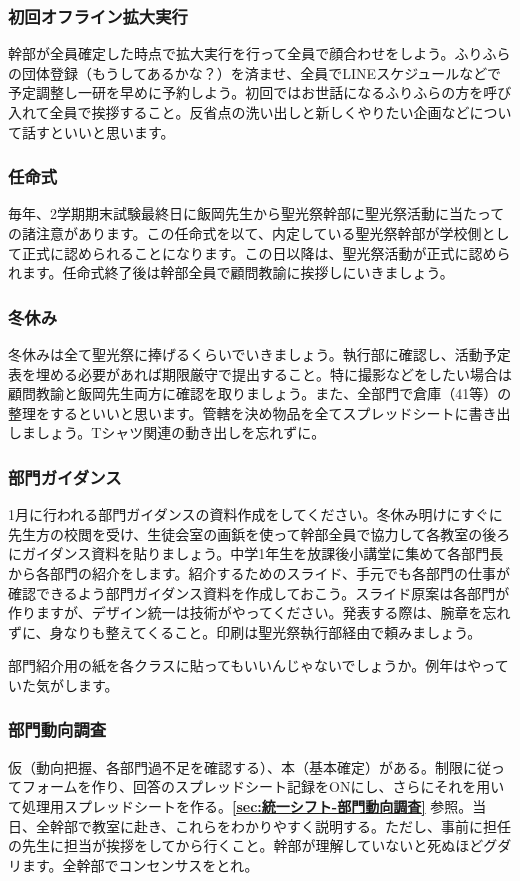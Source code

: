 \documentclass[dvipdfmx,jb5]{jarticle}
\begin{document}
\subsubsection{初回オフライン拡大実行}
幹部が全員確定した時点で拡大実行を行って全員で顔合わせをしよう。ふりふらの団体登録（もうしてあるかな？）を済ませ、全員でLINEスケジュールなどで予定調整し一研を早めに予約しよう。初回ではお世話になるふりふらの方を呼び入れて全員で挨拶すること。反省点の洗い出しと新しくやりたい企画などについて話すといいと思います。

\subsubsection{任命式}
毎年、2学期期末試験最終日に飯岡先生から聖光祭幹部に聖光祭活動に当たっての諸注意があります。この任命式を以て、内定している聖光祭幹部が学校側として正式に認められることになります。この日以降は、聖光祭活動が正式に認められます。任命式終了後は幹部全員で顧問教諭に挨拶しにいきましょう。

\subsubsection{冬休み}
冬休みは全て聖光祭に捧げるくらいでいきましょう。執行部に確認し、活動予定表を埋める必要があれば期限厳守で提出すること。特に撮影などをしたい場合は顧問教諭と飯岡先生両方に確認を取りましょう。また、全部門で倉庫（41等）の整理をするといいと思います。管轄を決め物品を全てスプレッドシートに書き出しましょう。Tシャツ関連の動き出しを忘れずに。

\subsubsection{部門ガイダンス}
1月に行われる部門ガイダンスの資料作成をしてください。冬休み明けにすぐに先生方の校閲を受け、生徒会室の画鋲を使って幹部全員で協力して各教室の後ろにガイダンス資料を貼りましょう。中学1年生を放課後小講堂に集めて各部門長から各部門の紹介をします。紹介するためのスライド、手元でも各部門の仕事が確認できるよう部門ガイダンス資料を作成しておこう。スライド原案は各部門が作りますが、デザイン統一は技術がやってください。発表する際は、腕章を忘れずに、身なりも整えてくること。印刷は聖光祭執行部経由で頼みましょう。

部門紹介用の紙を各クラスに貼ってもいいんじゃないでしょうか。例年はやっていた気がします。


\subsubsection{部門動向調査}
仮（動向把握、各部門過不足を確認する）、本（基本確定）がある。制限に従ってフォームを作り、回答のスプレッドシート記録をONにし、さらにそれを用いて処理用スプレッドシートを作る。{\bf \ref{sec:統一シフト-部門動向調査}} 参照。当日、全幹部で教室に赴き、これらをわかりやすく説明する。ただし、事前に担任の先生に担当が挨拶をしてから行くこと。幹部が理解していないと死ぬほどグダリます。全幹部でコンセンサスをとれ。
\end{document}

